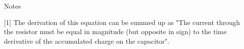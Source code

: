 \documentclass{beamer}
\begin{document}
\begin{frame}{Notes}
	\begin{flushleft}
		
			[1] The derivation of this equation can be summed up as "The current through the resistor must be equal in magnitude (but opposite in sign) to the time derivative of the accumulated charge on the capacitor".
			
		
		
	\end{flushleft}
\end{frame}



\myqrframe
\end{document}
